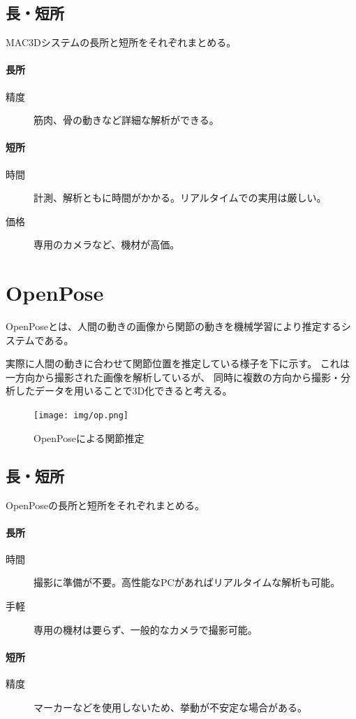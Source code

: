 \documentclass{jsarticle}
\begin{document}
        \subsection*{長・短所}
            MAC3Dシステムの長所と短所をそれぞれまとめる。

            \paragraph{長所}
                \begin{description}
                    \item[精度] 筋肉、骨の動きなど詳細な解析ができる。
                \end{description}

            \paragraph{短所}
                \begin{description}
                    \item[時間] 計測、解析ともに時間がかかる。リアルタイムでの実用は厳しい。
                    \item[価格] 専用のカメラなど、機材が高価。
                \end{description}

    \section{OpenPose}
        OpenPoseとは、人間の動きの画像から関節の動きを機械学習により推定するシステムである。

        実際に人間の動きに合わせて関節位置を推定している様子を下に示す。
        これは一方向から撮影された画像を解析しているが、
        同時に複数の方向から撮影・分析したデータを用いることで3D化できると考える。

        \begin{figure}[h]
            \centering
            \texttt{[image: img/op.png]}
            \caption{OpenPoseによる関節推定}
        \end{figure}

        \subsection*{長・短所}
            OpenPoseの長所と短所をそれぞれまとめる。

            \paragraph{長所}
                \begin{description}
                    \item[時間] 撮影に準備が不要。高性能なPCがあればリアルタイムな解析も可能。
                    \item[手軽] 専用の機材は要らず、一般的なカメラで撮影可能。
                \end{description}

            \paragraph{短所}
                \begin{description}
                    \item[精度] マーカーなどを使用しないため、挙動が不安定な場合がある。
                \end{description}
        
\end{document}
